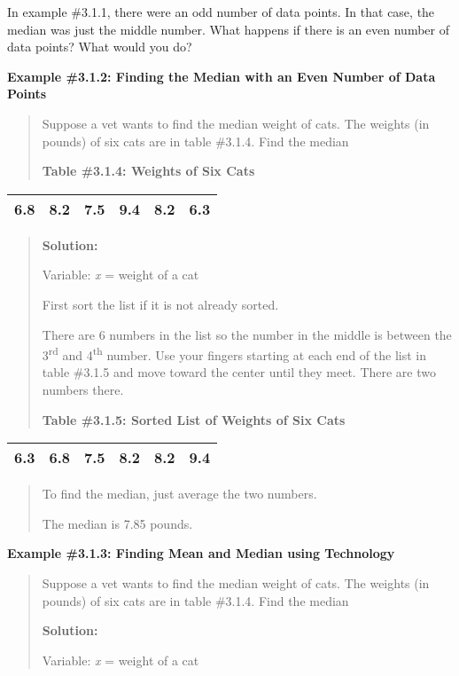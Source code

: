 \documentclass[]{book}
\begin{document}
In example \#3.1.1, there were an odd number of data points. In that
case, the median was just the middle number. What happens if there is an
even number of data points? What would you do?

\textbf{Example \#3.1.2: Finding the Median with an Even Number of Data
Points}

\begin{quote}
Suppose a vet wants to find the median weight of cats. The weights (in
pounds) of six cats are in table \#3.1.4. Find the median

\textbf{Table \#3.1.4: Weights of Six Cats}
\end{quote}

\begin{longtable}[]{@{}llllll@{}}
\toprule
\endhead
6.8 & 8.2 & 7.5 & 9.4 & 8.2 & 6.3\tabularnewline
\bottomrule
\end{longtable}

\begin{quote}
\textbf{Solution:}

Variable: \emph{x} = weight of a cat

First sort the list if it is not already sorted.

There are 6 numbers in the list so the number in the middle is between
the 3\textsuperscript{rd} and 4\textsuperscript{th} number. Use your fingers starting at each end of
the list in table \#3.1.5 and move toward the center until they meet.
There are two numbers there.

\textbf{Table \#3.1.5: Sorted List of Weights of Six Cats}
\end{quote}

\begin{longtable}[]{@{}llllll@{}}
\toprule
\endhead
6.3 & 6.8 & 7.5 & 8.2 & 8.2 & 9.4\tabularnewline
\bottomrule
\end{longtable}

\begin{quote}
To find the median, just average the two numbers.

The median is 7.85 pounds.
\end{quote}

\textbf{Example \#3.1.3: Finding Mean and Median using Technology}

\begin{quote}
Suppose a vet wants to find the median weight of cats. The weights (in
pounds) of six cats are in table \#3.1.4. Find the median

\textbf{Solution:}

Variable: \emph{x} = weight of a cat
\end{quote}
\end{document}
